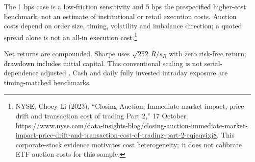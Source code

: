 The 1 bps case is a low-friction sensitivity and 5 bps the prespecified higher-cost benchmark, not an estimate of institutional or retail execution costs. Auction costs depend on order size, timing, volatility and imbalance direction; a quoted spread alone is not an all-in execution cost.\footnote{NYSE, Choey Li (2023), ``Closing Auction: Immediate market impact, price drift and transaction cost of trading Part 2,'' 17 October. \url{https://www.nyse.com/data-insights-blog/closing-auction-immediate-market-impact-price-drift-and-transaction-cost-of-trading-part-2-eqjcqvixj8}. This corporate-stock evidence motivates cost heterogeneity; it does not calibrate ETF auction costs for this sample.}

Net returns are compounded. Sharpe uses $\sqrt{252}\,\bar R/s_R$ with zero risk-free return; drawdown includes initial capital. This conventional scaling is not serial-dependence adjusted \citep{Lo2002}. Cash and daily fully invested intraday exposure are timing-matched benchmarks.

